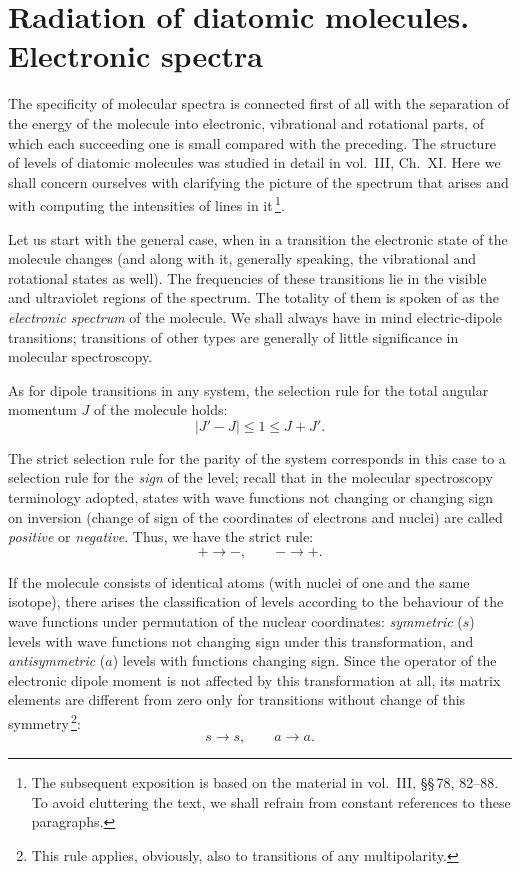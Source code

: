 \section{Radiation of diatomic molecules. Electronic spectra}

The specificity of molecular spectra is connected first of all with the separation of the energy of the molecule into electronic, vibrational and rotational parts, of which each succeeding one is small compared with the preceding. The structure of levels of diatomic molecules was studied in detail in vol.~III, Ch.~XI. Here we shall concern ourselves with clarifying the picture of the spectrum that arises and with computing the intensities of lines in it\,\footnote{The subsequent exposition is based on the material in vol.~III, \S\S\,78, 82--88. To avoid cluttering the text, we shall refrain from constant references to these paragraphs.}.

Let us start with the general case, when in a transition the electronic state of the molecule changes (and along with it, generally speaking, the vibrational and rotational states as well). The frequencies of these transitions lie in the visible and ultraviolet regions of the spectrum. The totality of them is spoken of as the \textit{electronic spectrum} of the molecule. We shall always have in mind electric-dipole transitions; transitions of other types are generally of little significance in molecular spectroscopy.

As for dipole transitions in any system, the selection rule for the total angular momentum $J$ of the molecule holds:
\begin{equation}
|J' - J| \leqslant 1 \leqslant J + J'.
\tag{53.1}
\end{equation}

The strict selection rule for the parity of the system corresponds in this case to a selection rule for the \textit{sign} of the level; recall that in the molecular spectroscopy terminology adopted, states with wave functions not changing or changing sign on inversion (change of sign of the coordinates of electrons and nuclei) are called \textit{positive} or \textit{negative}. Thus, we have the strict rule:
\begin{equation}
+ \to -,\qquad - \to +.
\tag{53.2}
\end{equation}

If the molecule consists of identical atoms (with nuclei of one and the same isotope), there arises the classification of levels according to the behaviour of the wave functions under permutation of the nuclear coordinates: \textit{symmetric} ($s$) levels with wave functions not changing sign under this transformation, and \textit{antisymmetric} ($a$) levels with functions changing sign. Since the operator of the electronic dipole moment is not affected by this transformation at all, its matrix elements are different from zero only for transitions without change of this symmetry\,\footnote{This rule applies, obviously, also to transitions of any multipolarity.}:
\begin{equation}
s \to s,\qquad a \to a.
\tag{53.3}
\end{equation}

